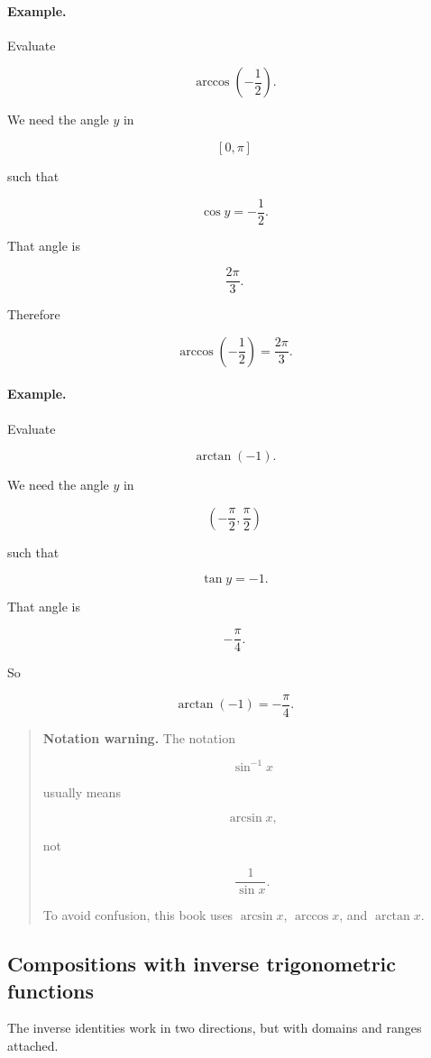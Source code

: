 \paragraph{Example.}
Evaluate

\[
\arccos\left(-\frac12\right).
\]

We need the angle \(y\) in

\[
[0,\pi]
\]

such that

\[
\cos y=-\frac12.
\]

That angle is

\[
\frac{2\pi}{3}.
\]

Therefore

\[
\boxed{
\arccos\left(-\frac12\right)=\frac{2\pi}{3}.
}
\]

\paragraph{Example.}
Evaluate

\[
\arctan(-1).
\]

We need the angle \(y\) in

\[
\left(-\frac{\pi}{2},\frac{\pi}{2}\right)
\]

such that

\[
\tan y=-1.
\]

That angle is

\[
-\frac{\pi}{4}.
\]

So

\[
\boxed{
\arctan(-1)=-\frac{\pi}{4}.
}
\]

\begin{quote}
\textbf{Notation warning.}
The notation

\[
\sin^{-1}x
\]

usually means

\[
\arcsin x,
\]

not

\[
\frac1{\sin x}.
\]

To avoid confusion, this book uses \(\arcsin x\), \(\arccos x\), and \(\arctan x\).
\end{quote}

\subsection{Compositions with inverse trigonometric functions}
\label{appsubsec:compositions-inverse-trig}

The inverse identities work in two directions, but with domains and ranges attached.

